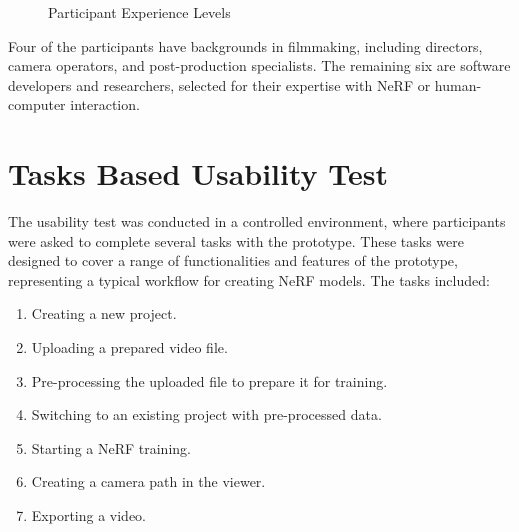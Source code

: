 \begin{figure}[htb]
  \centering
  \caption{Participant Experience Levels}
  \label{fig:study:experience}  
\end{figure}

Four of the participants have backgrounds in filmmaking, including directors, camera operators, and post-production specialists.
The remaining six are software developers and researchers, selected for their expertise with NeRF or human-computer interaction.

\section{Tasks Based Usability Test}
\label{sec:study:tasks}

The usability test was conducted in a controlled environment, where participants were asked to complete several tasks with the prototype.
These tasks were designed to cover a range of functionalities and features of the prototype, representing a typical workflow for creating NeRF models.
The tasks included:

\begin{enumerate}
  \item Creating a new project.
  \item Uploading a prepared video file.
  \item Pre-processing the uploaded file to prepare it for training.
  \item Switching to an existing project with pre-processed data.
  \item Starting a NeRF training.
  \item Creating a camera path in the viewer.
  \item Exporting a video.
\end{enumerate}

